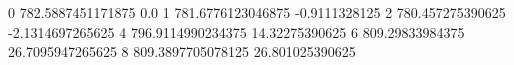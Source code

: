 0 782.5887451171875 0.0
1 781.6776123046875 -0.9111328125
2 780.457275390625 -2.1314697265625
4 796.9114990234375 14.32275390625
6 809.29833984375 26.7095947265625
8 809.3897705078125 26.801025390625
